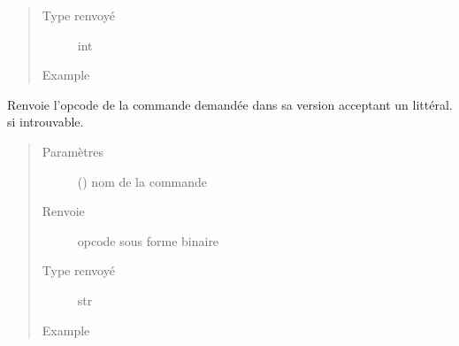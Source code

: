 \documentclass[letterpaper,10pt,french]{sphinxmanual}
\begin{document}
\begin{fulllineitems}
\begin{fulllineitems}
\begin{quote}
\begin{description}
\item[{Type renvoyé}] \leavevmode
int

\item[{Example}] \leavevmode
\begin{sphinxVerbatim}[commandchars=\\\{\}]
\end{sphinxVerbatim}

\end{description}\end{quote}

\end{fulllineitems}


\begin{fulllineitems}
\label{\detokenize{processorengine:processorengine.ProcessorEngine.getLitteralOpcode}}
Renvoie l’opcode de la commande demandée dans sa version acceptant un littéral. \sphinxcode{\sphinxupquote{\textquotesingle{}\textquotesingle{}}} si introuvable.
\begin{quote}\begin{description}
\item[{Paramètres}] \leavevmode
{} () \textendash{} nom de la commande

\item[{Renvoie}] \leavevmode
opcode sous forme binaire

\item[{Type renvoyé}] \leavevmode
str

\item[{Example}] \leavevmode
\begin{sphinxVerbatim}[commandchars=\\\{\}]
\end{sphinxVerbatim}


\end{description}
\end{quote}
\end{fulllineitems}
\end{fulllineitems}
\end{document}
